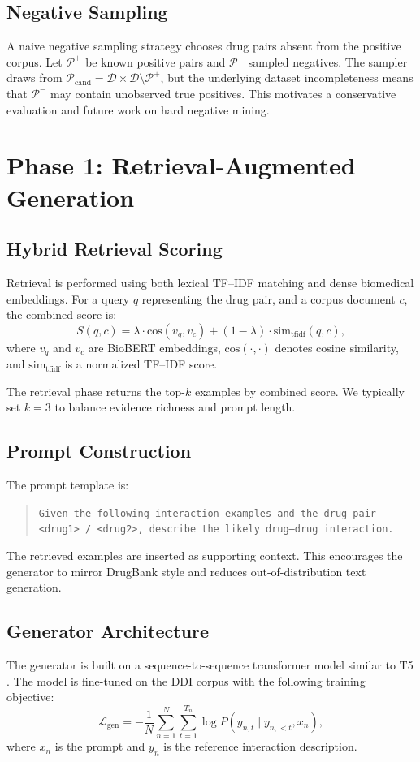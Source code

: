 \documentclass[conference]{IEEEtran}
\begin{document}
\subsection{Negative Sampling}
A naive negative sampling strategy chooses drug pairs absent from the positive corpus. Let $\mathcal{P}^+$ be known positive pairs and $\mathcal{P}^-$ sampled negatives. The sampler draws from $\mathcal{P}_{\text{cand}} = \mathcal{D} \times \mathcal{D} \setminus \mathcal{P}^+$, but the underlying dataset incompleteness means that $\mathcal{P}^-$ may contain unobserved true positives. This motivates a conservative evaluation and future work on hard negative mining.

\section{Phase 1: Retrieval-Augmented Generation}
\subsection{Hybrid Retrieval Scoring}
Retrieval is performed using both lexical TF--IDF matching and dense biomedical embeddings. For a query $q$ representing the drug pair, and a corpus document $c$, the combined score is:
\begin{equation}
    S(q,c) = \lambda \cdot \mathrm{cos}(v_q, v_c) + (1-\lambda) \cdot \mathrm{sim}_{\text{tfidf}}(q,c),
\end{equation}
where $v_q$ and $v_c$ are BioBERT embeddings, $\mathrm{cos}(\cdot,\cdot)$ denotes cosine similarity, and $\mathrm{sim}_{\text{tfidf}}$ is a normalized TF--IDF score.

The retrieval phase returns the top-$k$ examples by combined score. We typically set $k=3$ to balance evidence richness and prompt length.

\subsection{Prompt Construction}
The prompt template is:
\begin{quote}
\texttt{Given the following interaction examples and the drug pair <drug1> / <drug2>, describe the likely drug--drug interaction.}
\end{quote}
The retrieved examples are inserted as supporting context. This encourages the generator to mirror DrugBank style and reduces out-of-distribution text generation.

\subsection{Generator Architecture}
The generator is built on a sequence-to-sequence transformer model similar to T5 \cite{raffel2020t5}. The model is fine-tuned on the DDI corpus with the following training objective:
\begin{equation}
    \mathcal{L}_{\text{gen}} = -\frac{1}{N} \sum_{n=1}^{N} \sum_{t=1}^{T_n} \log P(y_{n,t} \mid y_{n,<t}, x_n),
\end{equation}
where $x_n$ is the prompt and $y_{n}$ is the reference interaction description.
\end{document}
